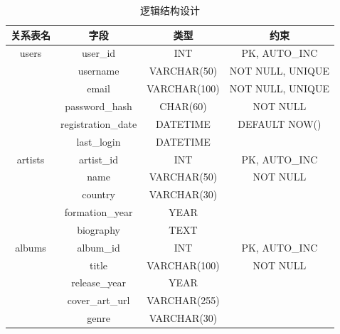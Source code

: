 \documentclass{base}
\begin{document}
\begin{longtable}{@{}cccc@{}}
\caption{逻辑结构设计}
\label{tab:my-table}\\
\toprule
\textbf{关系表名}   & \textbf{字段}        & \textbf{类型}  & \textbf{约束}                     \\* \midrule
\endhead
%
\bottomrule
\endfoot
%
\endlastfoot
%
users           & user\_id           & INT          & PK, AUTO\_INC                   \\
                & username           & VARCHAR(50)  & NOT NULL, UNIQUE                \\
                & email              & VARCHAR(100) & NOT NULL, UNIQUE                \\
                & password\_hash     & CHAR(60)     & NOT NULL                        \\
                & registration\_date & DATETIME     & DEFAULT NOW()                   \\
                & last\_login        & DATETIME     &                                 \\
artists         & artist\_id         & INT          & PK, AUTO\_INC                   \\
                & name               & VARCHAR(50)  & NOT NULL                        \\
                & country            & VARCHAR(30)  &                                 \\
                & formation\_year    & YEAR         &                                 \\
                & biography          & TEXT         &                                 \\
albums          & album\_id          & INT          & PK, AUTO\_INC                   \\
                & title              & VARCHAR(100) & NOT NULL                        \\
                & release\_year      & YEAR         &                                 \\
                & cover\_art\_url    & VARCHAR(255) &                                 \\
                & genre              & VARCHAR(30)  &                                 \\

\end{longtable}
\end{document}
